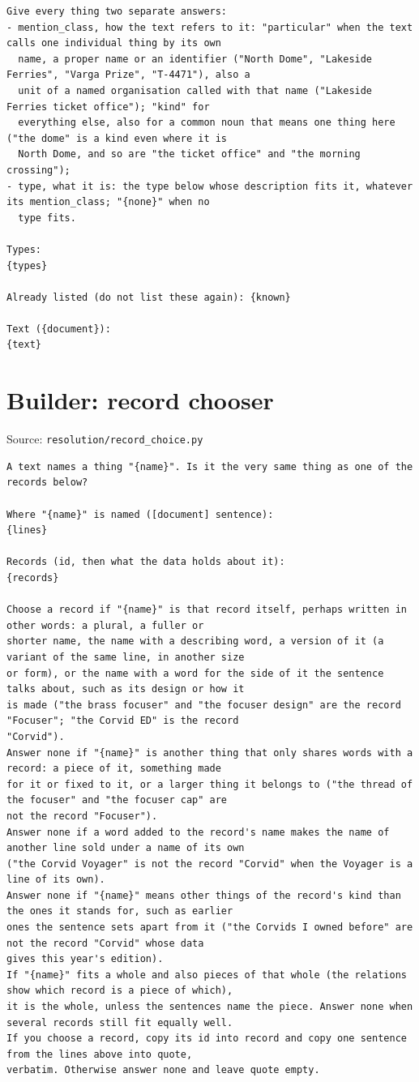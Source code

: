 \begin{lstlisting}
Give every thing two separate answers:
- mention_class, how the text refers to it: "particular" when the text calls one individual thing by its own
  name, a proper name or an identifier ("North Dome", "Lakeside Ferries", "Varga Prize", "T-4471"), also a
  unit of a named organisation called with that name ("Lakeside Ferries ticket office"); "kind" for
  everything else, also for a common noun that means one thing here ("the dome" is a kind even where it is
  North Dome, and so are "the ticket office" and "the morning crossing");
- type, what it is: the type below whose description fits it, whatever its mention_class; "{none}" when no
  type fits.

Types:
{types}

Already listed (do not list these again): {known}

Text ({document}):
{text}
\end{lstlisting}

\section*{Builder: record chooser}
\noindent Source: \texttt{resolution/record\_choice.py}
\begin{lstlisting}
A text names a thing "{name}". Is it the very same thing as one of the records below?

Where "{name}" is named ([document] sentence):
{lines}

Records (id, then what the data holds about it):
{records}

Choose a record if "{name}" is that record itself, perhaps written in other words: a plural, a fuller or
shorter name, the name with a describing word, a version of it (a variant of the same line, in another size
or form), or the name with a word for the side of it the sentence talks about, such as its design or how it
is made ("the brass focuser" and "the focuser design" are the record "Focuser"; "the Corvid ED" is the record
"Corvid").
Answer none if "{name}" is another thing that only shares words with a record: a piece of it, something made
for it or fixed to it, or a larger thing it belongs to ("the thread of the focuser" and "the focuser cap" are
not the record "Focuser").
Answer none if a word added to the record's name makes the name of another line sold under a name of its own
("the Corvid Voyager" is not the record "Corvid" when the Voyager is a line of its own).
Answer none if "{name}" means other things of the record's kind than the ones it stands for, such as earlier
ones the sentence sets apart from it ("the Corvids I owned before" are not the record "Corvid" whose data
gives this year's edition).
If "{name}" fits a whole and also pieces of that whole (the relations show which record is a piece of which),
it is the whole, unless the sentences name the piece. Answer none when several records still fit equally well.
If you choose a record, copy its id into record and copy one sentence from the lines above into quote,
verbatim. Otherwise answer none and leave quote empty.
\end{lstlisting}

